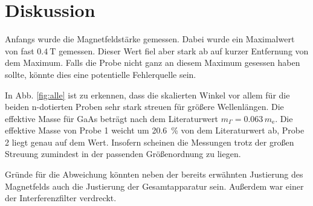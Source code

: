 \section{Diskussion}
\label{sec:Diskussion}

Anfangs wurde die Magnetfeldstärke gemessen. Dabei wurde ein Maximalwert von fast $\SI{0.4}{\tesla}$ gemessen. Dieser Wert fiel aber stark ab auf kurzer Entfernung von dem Maximum. Falls die Probe nicht ganz an diesem Maximum gesessen haben sollte, könnte dies eine potentielle Fehlerquelle sein. 

In Abb. \ref{fig:alle} ist zu erkennen, dass die skalierten Winkel vor allem für die beiden n-dotierten Proben sehr stark streuen für größere Wellenlängen. 
Die effektive Masse für GaAs beträgt nach dem Literaturwert $m_{\Gamma} = \num{0.063} \, m_\text{e}$. 
Die effektive Masse von Probe 1 weicht um \SI{20.6}{\percent} von dem Literaturwert ab, Probe 2 liegt genau auf dem Wert. 
Insofern scheinen die Messungen trotz der großen Streuung zumindest in der passenden Größenordnung zu liegen. 

Gründe für die Abweichung könnten neben der bereits erwähnten Justierung des Magnetfelds auch die Justierung der Gesamtapparatur sein. Außerdem war einer der Interferenzfilter verdreckt.



